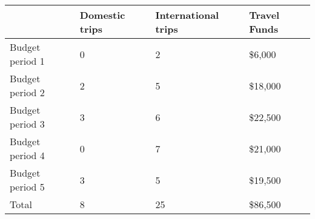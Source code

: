 \begin{tabular}{llll}
  \hline
  {} & Domestic trips & International trips & Travel Funds \\
  \hline
  Budget period 1 &              0 &                   2 &       \$6,000 \\
  Budget period 2 &              2 &                   5 &      \$18,000 \\
  Budget period 3 &              3 &                   6 &      \$22,500 \\
  Budget period 4 &              0 &                   7 &      \$21,000 \\
  Budget period 5 &              3 &                   5 &      \$19,500 \\
  \hline
  Total &              8 &                   25 &      \$86,500 \\
  \hline
\end{tabular}
